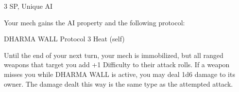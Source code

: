3 SP, Unique  
AI  

Your mech gains the AI property and the following protocol:
 

         DHARMA WALL  
         Protocol  
         3 Heat (self)  

         Until the end of your next turn, your mech is immobilized, but all ranged weapons that  
         target you add +1 Difficulty to their attack rolls. If a weapon misses you while DHARMA  
         WALL is active, you may deal 1d6 damage to its owner. The damage dealt this way is the  
         same type as the attempted attack.
 

                                                                                                                    
